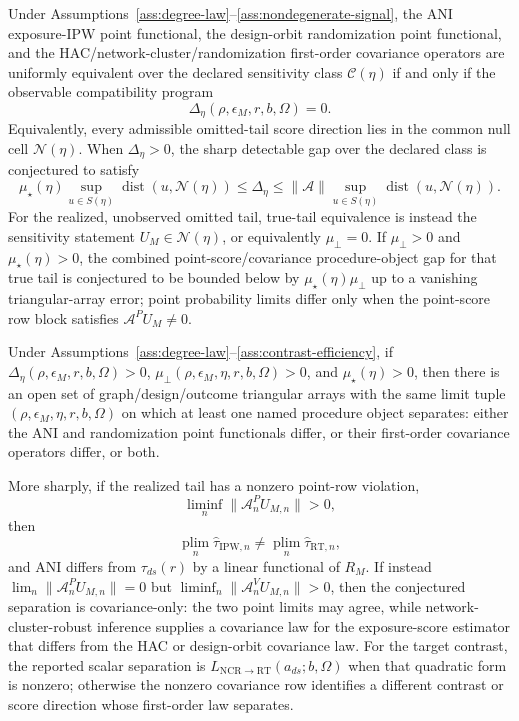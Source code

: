 \documentclass[11pt]{article}
\newcommand{\plim}{\operatorname*{plim}}
\theoremstyle{definition}
\theoremstyle{plain}
\theoremstyle{remark}
\begin{document}
\begin{conjecture}\label{conj:spectral-frontier}
Under Assumptions~\ref{ass:degree-law}--\ref{ass:nondegenerate-signal}, the
ANI exposure-IPW point functional, the design-orbit randomization point
functional, and the HAC/network-cluster/randomization first-order covariance
operators are uniformly equivalent over the declared sensitivity class
\(\mathcal C(\eta)\) if and only if the observable compatibility program
\[
  \Delta_\eta(\rho,\epsilon_M,r,b,\Omega)=0.
\]
Equivalently, every admissible omitted-tail score direction lies in the common
null cell \(\mathcal N(\eta)\).  When \(\Delta_\eta>0\), the sharp detectable
gap over the declared class is conjectured to satisfy
\[
  \mu_\star(\eta)
  \sup_{u\in S(\eta)}\operatorname{dist}(u,\mathcal N(\eta))
  \le
  \Delta_\eta
  \le
  \|\mathcal A\|
  \sup_{u\in S(\eta)}\operatorname{dist}(u,\mathcal N(\eta)).
\]
For the realized, unobserved omitted tail, true-tail equivalence is instead
the sensitivity statement \(U_M\in\mathcal N(\eta)\), or equivalently
\(\mu_{\perp}=0\).  If \(\mu_{\perp}>0\) and \(\mu_\star(\eta)>0\), the
combined point-score/covariance procedure-object gap for that true tail is
conjectured to be bounded below by \(\mu_\star(\eta)\mu_{\perp}\) up to a
vanishing triangular-array error; point probability limits differ only when
the point-score row block satisfies \(\mathcal A^P U_M\ne0\).
\end{conjecture}

\begin{conjecture}\label{conj:strict-separation}
Under Assumptions~\ref{ass:degree-law}--\ref{ass:contrast-efficiency}, if
\(\Delta_\eta(\rho,\epsilon_M,r,b,\Omega)>0\),
\(\mu_{\perp}(\rho,\epsilon_M,\eta,r,b,\Omega)>0\), and
\(\mu_\star(\eta)>0\), then there is an open set of graph/design/outcome
triangular arrays with the same limit tuple
\((\rho,\epsilon_M,\eta,r,b,\Omega)\)
on which at least one named procedure object separates: either the ANI and
randomization point functionals differ, or their first-order covariance
operators differ, or both.

More sharply, if the realized tail has a nonzero point-row violation,
\[
  \liminf_n \|\mathcal A^P_n U_{M,n}\|>0,
\]
then
\[
  \plim_n \hat\tau_{\mathrm{IPW},n}
  \ne
  \plim_n \hat\tau_{\mathrm{RT},n},
\]
and ANI differs from \(\tau_{ds}(r)\) by a linear functional of \(R_M\).  If
instead \(\lim_n\|\mathcal A^P_n U_{M,n}\|=0\) but
\(\liminf_n\|\mathcal A^V_n U_{M,n}\|>0\), then the conjectured separation is
covariance-only: the two point limits may agree, while network-cluster-robust
inference supplies a covariance law for the exposure-score estimator that
differs from the HAC or design-orbit covariance law.  For the target contrast,
the reported scalar separation is
\(L_{\mathrm{NCR}\to\mathrm{RT}}(a_{ds};b,\Omega)\) when that quadratic form is
nonzero; otherwise the nonzero covariance row identifies a different contrast
or score direction whose first-order law separates.
\end{conjecture}
\end{document}
